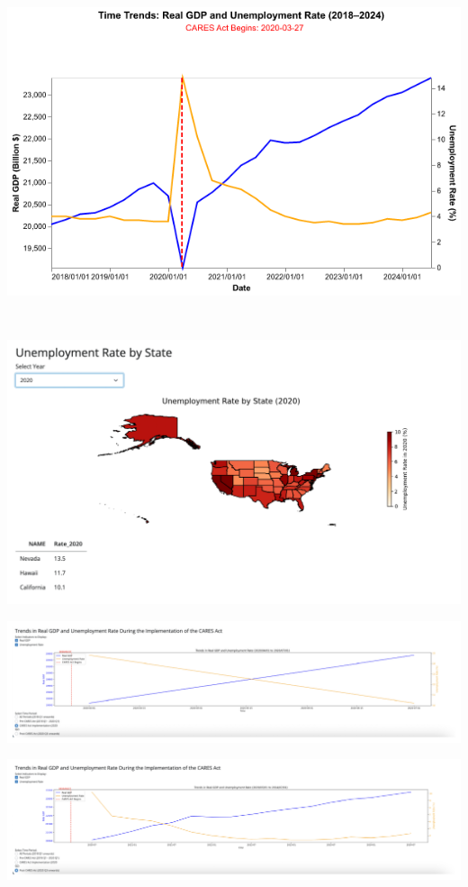 \documentclass[
]{article}
\begin{document}
\includegraphics[width=6.21875in,height=3.95833in]{write_up_files/figure-pdf/cell-6-output-1.png}

\includegraphics{write_up_files/figure-pdf/cell-15-output-1.pdf}

\includegraphics{write_up_files/figure-pdf/cell-16-output-1.pdf}

\includegraphics{write_up_files/figure-pdf/cell-16-output-2.pdf}
\end{document}

